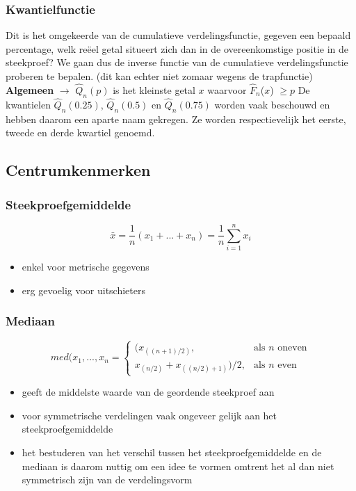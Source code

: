 \documentclass[titlepage]{article}
\numberwithin{equation}{section}
\begin{document}
\subsubsection{Kwantielfunctie}
Dit is het omgekeerde van de cumulatieve verdelingsfunctie, gegeven een bepaald percentage, welk reëel getal situeert zich dan in de overeenkomstige positie in de steekproef? We gaan dus de inverse functie van de cumulatieve verdelingsfunctie proberen te bepalen. (dit kan echter niet zomaar wegens de trapfunctie)\newline
\newline\textbf{Algemeen} $\rightarrow$ $\hat{Q}_{n}(p)$ is het kleinste getal $x$ waarvoor $\hat{F}_{n}$($x$) $\geq p$\newline \newline
De kwantielen $\hat{Q}_{n}(0.25)$, $\hat{Q}_{n}(0.5)$ en $\hat{Q}_{n}(0.75)$ worden vaak beschouwd en hebben daarom een aparte naam gekregen. Ze worden respectievelijk het eerste, tweede en derde kwartiel genoemd.
\subsection{Centrumkenmerken}
\subsubsection{Steekproefgemiddelde}
\begin{equation}
	\bar{x} = \frac{1}{n}(x_{1} + ... + x_{n}) = \frac{1}{n} \sum\limits_{i=1}^n x_{i}
	\label{2.9}
\end{equation}
\begin{itemize}
	\item enkel voor metrische gegevens
	\item erg gevoelig voor uitschieters
\end{itemize}
\subsubsection{Mediaan}
\begin{equation}
	med(x_{1}, ... , x_{n} = \begin{cases} (x_{((n+1)/2)}, & \mbox{als } n\mbox{ oneven} \\ x_{(n/2)} + x_{((n/2)+1)})/2, & \mbox{als } n\mbox{ even} \end{cases}
	\label{2.10}
\end{equation}
\begin{itemize}
	\item geeft de middelste waarde van de geordende steekproef aan
	\item voor symmetrische verdelingen vaak ongeveer gelijk aan het steekproefgemiddelde
	\item het bestuderen van het verschil tussen het steekproefgemiddelde en de mediaan is daarom nuttig om een idee te vormen omtrent het al dan niet symmetrisch zijn van de verdelingsvorm
\end{itemize}
\end{document}
